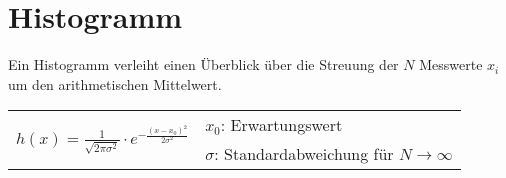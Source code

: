 \section{Histogramm}

Ein Histogramm verleiht einen \"Uberblick \"uber die Streuung der $N$ Messwerte $x_i$ um den
arithmetischen Mittelwert.

\begin{tabular}{ll}
    \multirow{2}{*}{ $h(x) = \frac{1}{\sqrt{ 2\pi\sigma^2 }} \cdot e^{-\frac{ (x-x_0)^2 }{ 2\sigma^2 }}$ } & $x_0$: Erwartungswert \\
    & $\sigma$: Standardabweichung f\"ur $N \to \infty$ \\
\end{tabular}
